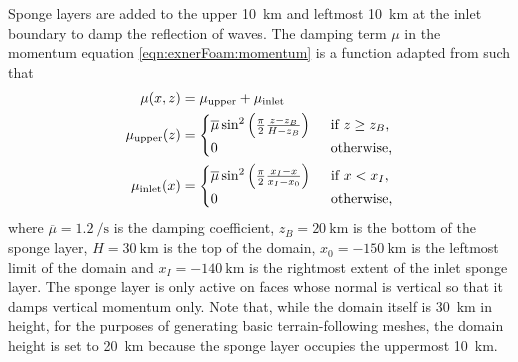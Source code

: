 Sponge layers are added to the upper \SI{10}{\kilo\meter} and leftmost \SI{10}{\kilo\meter} at the inlet boundary to damp the reflection of waves.
The damping term \(\mu\) in the momentum equation \eqref{eqn:exnerFoam:momentum} is a function adapted from \citet{melvin2010} such that
\begin{subequations}
\begin{align}
	\mu(x, z) &= \mu_\mathrm{upper} + \mu_\mathrm{inlet} \\
	\mu_\mathrm{upper}(z) &= \begin{cases}
		\overline{\mu} \sin^2 \left( \frac{\pi}{2} \frac{z - z_B}{H - z_B} \right) & \enskip \text{if $z \geq z_B$,} \\
		0 & \enskip \text{otherwise,} \\
	\end{cases} \\
	\mu_\mathrm{inlet}(x) &= \begin{cases}
		\overline{\mu} \sin^2 \left( \frac{\pi}{2} \frac{x_I - x}{x_I - x_0} \right) & \enskip \text{if $x < x_I$,} \\
		0 & \enskip \text{otherwise,}
	\end{cases}
\end{align}%
\end{subequations}
where $\overline{\mu} = \SI{1.2}{\per\second}$ is the damping coefficient, $z_B = \SI{20}{\kilo\meter}$ is the bottom of the sponge layer, $H = \SI{30}{\kilo\meter}$ is the top of the domain, $x_0 = \SI{-150}{\kilo\meter}$ is the leftmost limit of the domain and $x_I = \SI{-140}{\kilo\meter}$ is the rightmost extent of the inlet sponge layer.
The sponge layer is only active on faces whose normal is vertical so that it damps vertical momentum only.
Note that, while the domain itself is \SI{30}{\kilo\meter} in height, for the purposes of generating basic terrain-following meshes, the domain height is set to \SI{20}{\kilo\meter} because the sponge layer occupies the uppermost \SI{10}{\kilo\meter}.


